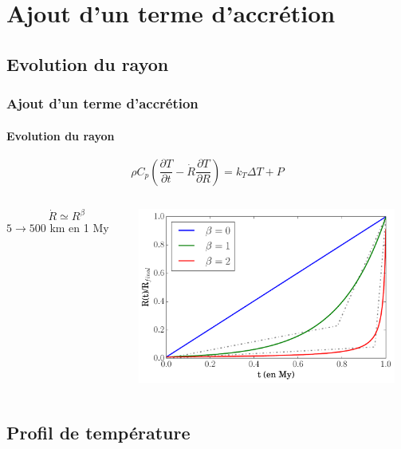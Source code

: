 \documentclass{beamer}
\begin{document}
\section{Ajout d'un terme d'accrétion}
\subsection{Evolution du rayon}

\begin{frame}
	\frametitle{Ajout d'un terme d'accrétion}
	\framesubtitle{Evolution du rayon}

		{\Large $$\rho C_p \left(\dfrac{\partial T}{\partial t} - \dot{R}\dfrac{\partial T}{\partial R}\right)  = k_{T} \Delta T  + P$$}
\begin{columns}
    \begin{column}{3.7cm}
      	{\huge $$\ \ \dot{R} \simeq R^\beta$$}
      	$5\rightarrow500$ km en 1 My
	\end{column}

	\begin{column}{9cm}
\center \includegraphics[width = 8.5cm]{figures/rayon.pdf}
	\end{column}
\end{columns}
\end{frame}

\subsection{Profil de température}
\end{document}

